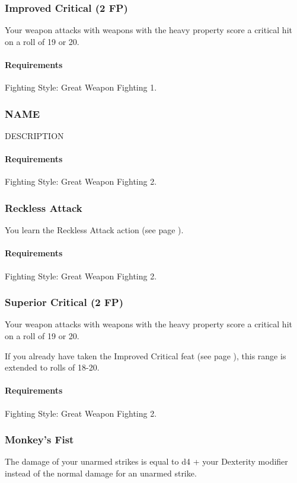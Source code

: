 \subsubsection{Improved Critical (2 FP)} \label{feat::improvedcritical}
    Your weapon attacks with weapons with the heavy property score a critical hit on a roll of 19 or 20.
    \paragraph{Requirements} Fighting Style: Great Weapon Fighting 1.
\subsubsection{NAME} \label{feat::name}
    DESCRIPTION
    \paragraph{Requirements} Fighting Style: Great Weapon Fighting 2.
\subsubsection{Reckless Attack} \label{feat::recklessattack}
    You learn the Reckless Attack action (see page \pageref{act::recklessattack}).
    \paragraph{Requirements} Fighting Style: Great Weapon Fighting 2.
\subsubsection{Superior Critical (2 FP)} \label{feat::superiorcritical}
    Your weapon attacks with weapons with the heavy property score a critical hit on a roll of 19 or 20.

    If you already have taken the Improved Critical feat (see page \pageref{feat::improvedcritical}), this range is extended to rolls of 18-20.
    \paragraph{Requirements} Fighting Style: Great Weapon Fighting 2.
\subsubsection{Monkey's Fist} \label{feat::monkeysfist}
    The damage of your unarmed strikes is equal to d4 + your Dexterity modifier instead of the normal damage for an unarmed strike.

